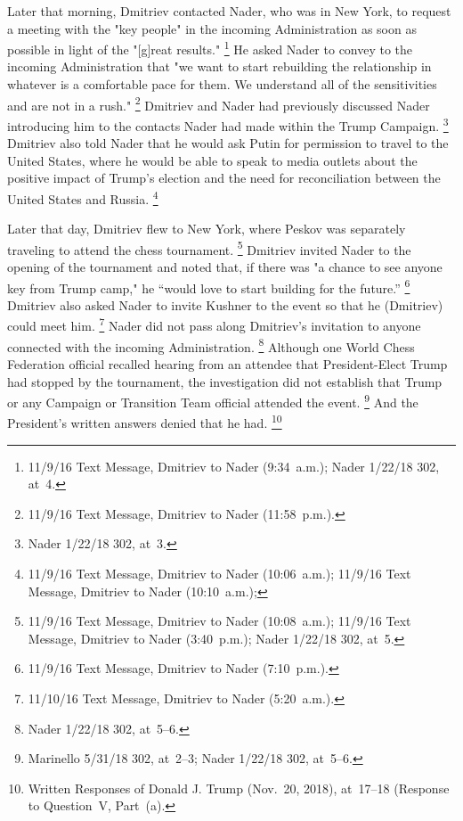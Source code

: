 Later that morning, Dmitriev contacted Nader, who was in New York, to request a meeting with the "key people" in the incoming Administration as soon as possible in light of the "[g]reat results."%
\footnote{11/9/16 Text Message, Dmitriev to Nader (9:34~a.m.);
Nader 1/22/18 302, at~4.}
He asked Nader to convey to the incoming Administration that "we want to start rebuilding the relationship in whatever is a comfortable pace for them.
We understand all of the sensitivities and are not in a rush."%
\footnote{11/9/16 Text Message, Dmitriev to Nader (11:58~p.m.).}
Dmitriev and Nader had previously discussed Nader introducing him to the contacts Nader had made within the Trump Campaign.%
\footnote{Nader 1/22/18 302, at~3.}
Dmitriev also told Nader that he would ask Putin for permission to travel to the United States, where he would be able to speak to media outlets about the positive impact of Trump's election and the need for reconciliation between the United States and Russia.%
\footnote{11/9/16 Text Message, Dmitriev to Nader (10:06~a.m.);
11/9/16 Text Message, Dmitriev to Nader (10:10~a.m.);
}

Later that day, Dmitriev flew to New York, where Peskov was separately traveling to attend the chess tournament.%
\footnote{11/9/16 Text Message, Dmitriev to Nader (10:08~a.m.);
11/9/16 Text Message, Dmitriev to Nader (3:40~p.m.);
Nader 1/22/18 302, at~5.}
Dmitriev invited Nader to the opening of the tournament and noted that, if there was "a chance to see anyone key from Trump camp," he ``would love to start building for the future.''%
\footnote{11/9/16 Text Message, Dmitriev to Nader (7:10~p.m.).}
Dmitriev also asked Nader to invite Kushner to the event so that he (Dmitriev) could meet him.%
\footnote{11/10/16 Text Message, Dmitriev to Nader (5:20~a.m.).}
Nader did not pass along Dmitriev's invitation to anyone connected with the incoming Administration.%
\footnote{Nader 1/22/18 302, at~5--6.}
Although one World Chess Federation official recalled hearing from an attendee that President-Elect Trump had stopped by the tournament, the investigation did not establish that Trump or any Campaign or Transition Team official attended the event.%
\footnote{Marinello 5/31/18 302, at~2--3;
Nader 1/22/18 302, at~5--6.}
And the President's written answers denied that he had.%
\footnote{Written Responses of Donald J. Trump (Nov.~20, 2018), at~17--18 (Response to Question~V, Part~(a).}

